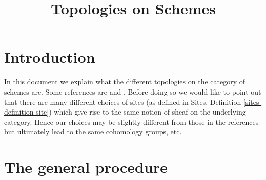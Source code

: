 \documentclass{stacks-project}
\theoremstyle{plain}
\theoremstyle{definition}
\theoremstyle{remark}
\numberwithin{equation}{subsection}
\begin{document}
\title{Topologies on Schemes}

\maketitle

\label{section-phantom}

\tableofcontents



\section{Introduction}
\label{section-introduction}

\noindent
In this document we explain what the different topologies on the
category of schemes are. Some references are \cite{SGA1} and \cite{Ner}.
Before doing so we would like to point out that there are many
different choices of sites (as defined in
Sites, Definition \ref{sites-definition-site}) which give rise to
the same notion of sheaf on the underlying category. Hence
our choices may be slightly different from those in the references
but ultimately lead to the same cohomology groups, etc.

\section{The general procedure}
\label{section-procedure}
\end{document}

